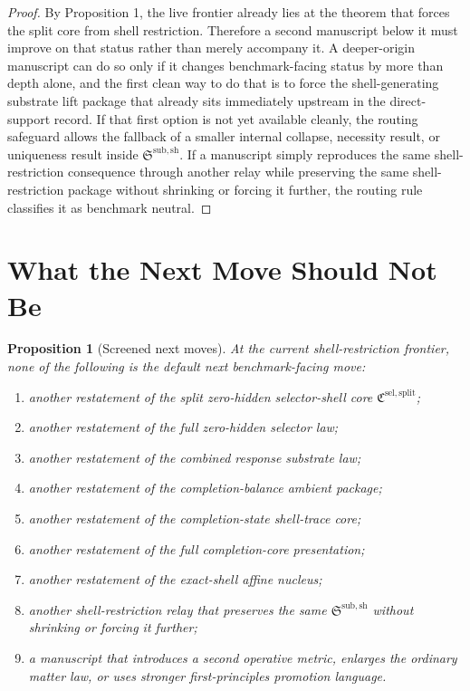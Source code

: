\documentclass[11pt]{article}
\newcommand{\SelectorCore}{\mathfrak C^{\mathrm{sel,split}}}
\newcommand{\ShellRestriction}{\mathfrak S^{\mathrm{sub,sh}}}
\newtheorem{proposition}{Proposition}
\begin{document}
\begin{proof}
By Proposition 1, the live frontier already lies at the theorem that forces the split core from shell restriction. Therefore a second manuscript below it must improve on that status rather than merely accompany it. A deeper-origin manuscript can do so only if it changes benchmark-facing status by more than depth alone, and the first clean way to do that is to force the shell-generating substrate lift package that already sits immediately upstream in the direct-support record. If that first option is not yet available cleanly, the routing safeguard allows the fallback of a smaller internal collapse, necessity result, or uniqueness result inside \(\ShellRestriction\). If a manuscript simply reproduces the same shell-restriction consequence through another relay while preserving the same shell-restriction package without shrinking or forcing it further, the routing rule classifies it as benchmark neutral.
\end{proof}

\section{What the Next Move Should Not Be}

\begin{proposition}[Screened next moves]
At the current shell-restriction frontier, none of the following is the default next benchmark-facing move:
\begin{enumerate}
    \item another restatement of the split zero-hidden selector-shell core \(\SelectorCore\);
    \item another restatement of the full zero-hidden selector law;
    \item another restatement of the combined response substrate law;
    \item another restatement of the completion-balance ambient package;
    \item another restatement of the completion-state shell-trace core;
    \item another restatement of the full completion-core presentation;
    \item another restatement of the exact-shell affine nucleus;
    \item another shell-restriction relay that preserves the same \(\ShellRestriction\) without shrinking or forcing it further;
    \item a manuscript that introduces a second operative metric, enlarges the ordinary matter law, or uses stronger first-principles promotion language.
\end{enumerate}
\end{proposition}
\end{document}

